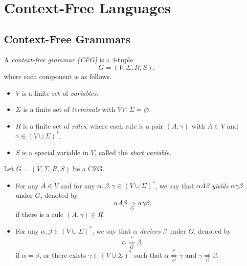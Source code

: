 \chapter{Context-Free Languages}
\section{Context-Free Grammars}
\begin{definition}
  A \emph{context-free grammar (CFG)} is a $4$-tuple
  \begin{equation*}
    G = (V, \Sigma, R, S),
  \end{equation*}
  where each component is as follows.
  \begin{itemize}
    \item $V$ is a finite set of \emph{variables}.
    \item $\Sigma$ is a finite set of \emph{terminals} with $V \cap \Sigma =
    \varnothing$.
    \item $R$ is a finite set of \emph{rules}, where each rule is a pair
    $(A, \gamma)$ with $A \in V$ and $\gamma \in (V \cup \Sigma)^*$.
    \item $S$ is a special variable in $V$, called the \emph{start variable}.
  \end{itemize}
\end{definition}

\begin{definition}
  Let $G = (V, \Sigma, R, S)$ be a CFG.
  \begin{itemize}
    \item For any $A \in V$ and for any $\alpha, \beta, \gamma \in (V \cup
    \Sigma)^*$, we say that $\alpha A \beta$ \emph{yields} $\alpha\gamma\beta$
    under $G$, denoted by
    \begin{equation*}
      \alpha A \beta \mathrel{\mathop\Rightarrow\limits_G} \alpha\gamma\beta,
    \end{equation*}
    if there is a rule $(A, \gamma) \in R$.
    \item For any $\alpha, \beta \in (V \cup \Sigma)^*$, we say that $\alpha$
    \emph{derives} $\beta$ under $G$, denoted by
    \begin{equation*}
      \alpha \mathrel{\mathop\Rightarrow\limits_G^*} \beta,
    \end{equation*}
    if $\alpha = \beta$, or there exists $\gamma \in (V \cup\Sigma)^*$ such
    that $\alpha \mathrel{\mathop\Rightarrow\limits_G^*}\gamma$ and
    $\gamma \mathrel{\mathop\Rightarrow\limits_G} \beta$.
  \end{itemize}
\end{definition}


